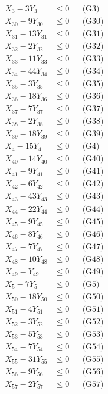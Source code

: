 \documentclass[a4paper,10pt]{article}
\begin{document}
{\begin{align}
X_{3} - 3Y_{3} &\leq 0 && \text{(G3)} \\
\allowbreak
X_{30} - 9Y_{30} &\leq 0 && \text{(G30)} \\
X_{31} - 13Y_{31} &\leq 0 && \text{(G31)} \\
X_{32} - 2Y_{32} &\leq 0 && \text{(G32)} \\
X_{33} - 11Y_{33} &\leq 0 && \text{(G33)} \\
X_{34} - 44Y_{34} &\leq 0 && \text{(G34)} \\
X_{35} - 3Y_{35} &\leq 0 && \text{(G35)} \\
X_{36} - 18Y_{36} &\leq 0 && \text{(G36)} \\
X_{37} - 7Y_{37} &\leq 0 && \text{(G37)} \\
X_{38} - 2Y_{38} &\leq 0 && \text{(G38)} \\
X_{39} - 18Y_{39} &\leq 0 && \text{(G39)} \\
X_{4} - 15Y_{4} &\leq 0 && \text{(G4)} \\
X_{40} - 14Y_{40} &\leq 0 && \text{(G40)} \\
X_{41} - 9Y_{41} &\leq 0 && \text{(G41)} \\
X_{42} - 6Y_{42} &\leq 0 && \text{(G42)} \\
X_{43} - 43Y_{43} &\leq 0 && \text{(G43)} \\
X_{44} - 22Y_{44} &\leq 0 && \text{(G44)} \\
X_{45} - 9Y_{45} &\leq 0 && \text{(G45)} \\
X_{46} - 8Y_{46} &\leq 0 && \text{(G46)} \\
X_{47} - 7Y_{47} &\leq 0 && \text{(G47)} \\
X_{48} - 10Y_{48} &\leq 0 && \text{(G48)} \\
\allowbreak
X_{49} - Y_{49} &\leq 0 && \text{(G49)} \\
X_{5} - 7Y_{5} &\leq 0 && \text{(G5)} \\
X_{50} - 18Y_{50} &\leq 0 && \text{(G50)} \\
X_{51} - 4Y_{51} &\leq 0 && \text{(G51)} \\
X_{52} - 3Y_{52} &\leq 0 && \text{(G52)} \\
X_{53} - 5Y_{53} &\leq 0 && \text{(G53)} \\
X_{54} - 7Y_{54} &\leq 0 && \text{(G54)} \\
X_{55} - 31Y_{55} &\leq 0 && \text{(G55)} \\
X_{56} - 9Y_{56} &\leq 0 && \text{(G56)} \\
X_{57} - 2Y_{57} &\leq 0 && \text{(G57)} \\

\end{align}}
\end{document}
